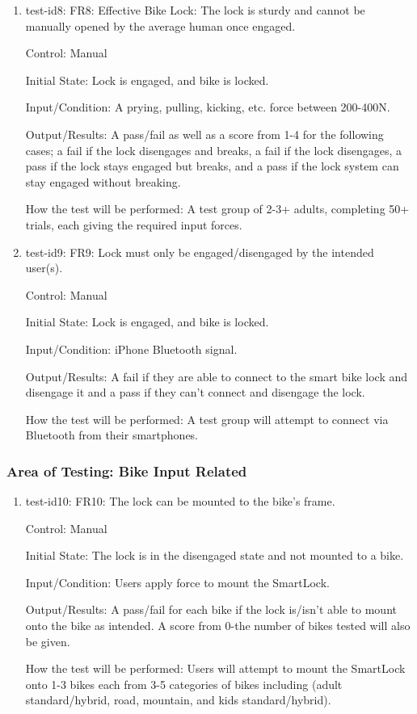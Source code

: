 \documentclass[12pt, titlepage]{article}
\begin{document}
\begin{enumerate}
\item{test-id8: FR8: Effective Bike Lock: The lock is sturdy and cannot be manually opened by the average human once engaged. \\}

Control: Manual

Initial State: Lock is engaged, and bike is locked.

Input/Condition: A prying, pulling, kicking, etc. force between 200-400N.

Output/Results: A pass/fail as well as a score from 1-4 for the following cases; a fail if the lock disengages and breaks, a fail if the lock disengages, a pass if the lock stays engaged but breaks, and a pass if the lock system can stay engaged without breaking.

How the test will be performed: A test group of 2-3+ adults, completing 50+ trials, each giving the required input forces.

\item{test-id9: FR9: Lock must only be engaged/disengaged by the intended user(s). \\}

Control: Manual

Initial State: Lock is engaged, and bike is locked.

Input/Condition: iPhone Bluetooth signal.

Output/Results: A fail if they are able to connect to the smart bike lock and disengage it and a pass if they can’t connect and disengage the lock.

How the test will be performed: A test group will attempt to connect via Bluetooth from their smartphones.

\end{enumerate}

\subsubsection{Area of Testing: Bike Input Related}

\begin{enumerate}

\item{test-id10: FR10: The lock can be mounted to the bike’s frame. \\}

Control: Manual

Initial State: The lock is in the disengaged state and not mounted to a bike.

Input/Condition: Users apply force to mount the SmartLock.

Output/Results: A pass/fail for each bike if the lock is/isn’t able to mount onto the bike as intended. A score from 0-the number of bikes tested will also be given.

How the test will be performed: Users will attempt to mount the SmartLock onto 1-3 bikes each from 3-5 categories of bikes including (adult standard/hybrid, road, mountain, and kids standard/hybrid).

\end{enumerate}
\end{document}
